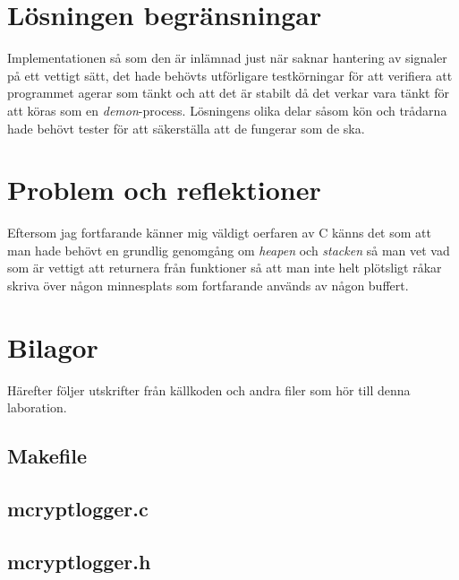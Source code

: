 \documentclass[a4paper, 12pt]{article}
\begin{document}
\section{Lösningen begränsningar}\label{sec:losningensbegransningar}
Implementationen så som den är inlämnad just när saknar hantering av
signaler på ett vettigt sätt, det hade behövts utförligare
testkörningar för att verifiera att programmet agerar som tänkt och
att det är stabilt då det verkar vara tänkt för att köras som en
\textit{demon}-process. Lösningens olika delar såsom kön och trådarna
hade behövt tester för att säkerställa att de fungerar som de ska.

\section{Problem och reflektioner}\label{sec:problemochreflektioner}
Eftersom jag fortfarande känner mig väldigt oerfaren av C känns det
som att man hade behövt en grundlig genomgång om \textit{heapen} och
\textit{stacken} så man vet vad som är vettigt att returnera från
funktioner så att man inte helt plötsligt råkar skriva över någon
minnesplats som fortfarande används av någon buffert.

\newpage
\appendix
{}
\section{Bilagor}\label{Bilagor}
Härefter följer utskrifter från källkoden och andra filer som hör till
denna laboration.

\newpage
\subsection{Makefile}\label{Makefile}
\begin{scriptsize}
  
\end{scriptsize}

\subsection{mcryptlogger.c}\label{mcryptlogger.c}
\begin{scriptsize}
  
\end{scriptsize}

\subsection{mcryptlogger.h}\label{mcryptlogger.h}
\begin{scriptsize}
  
\end{scriptsize}
\end{document}
